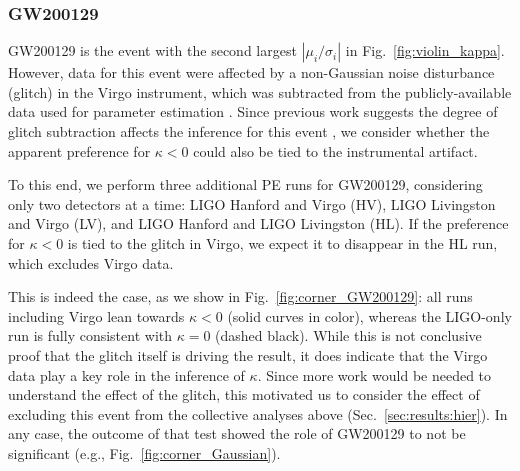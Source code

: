 \documentclass[aps,prd,twocolumn,superscriptaddress,preprintnumbers,nofootinbib]{revtex4-2}
\begin{document}
% 
% 


\subsubsection{GW200129}
\label{sec:GW200129}

GW200129 is the event with the second largest $|\mu_i/\sigma_i|$ in Fig.~\ref{fig:violin_kappa}.
However, data for this event were affected by a non-Gaussian noise disturbance (glitch) in the Virgo instrument, which was subtracted from the publicly-available data used for parameter estimation \cite{Davis:2022ird}.
Since previous work suggests the degree of glitch subtraction affects the inference for this event \citep{GW200129_glitch}, we consider whether the apparent preference for $\kappa < 0$ could also be tied to the instrumental artifact.

To this end, we perform three additional \ac{PE} runs for GW200129, considering only two detectors at a time: LIGO Hanford and Virgo (HV), LIGO Livingston and Virgo (LV), and LIGO Hanford and LIGO Livingston (HL).
If the preference for $\kappa < 0$ is tied to the glitch in Virgo, we expect it to disappear in the HL run, which excludes Virgo data.

This is indeed the case, as we show in Fig.~\ref{fig:corner_GW200129}: all runs including Virgo lean towards $\kappa < 0$ (solid curves in color), whereas the LIGO-only run is fully consistent with $\kappa = 0$ (dashed black).
While this is not conclusive proof that the glitch itself is driving the result, it does indicate that the Virgo data play a key role in the inference of $\kappa$.
Since more work would be needed to understand the effect of the glitch, this motivated us to consider the effect of excluding this event from the collective analyses above (Sec.~\ref{sec:results:hier}).
In any case, the outcome of that test showed the role of GW200129 to not be significant (e.g., Fig.~\ref{fig:corner_Gaussian}).
\end{document}
